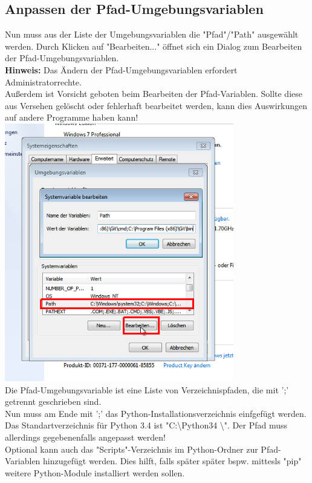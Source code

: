 \documentclass[ngerman,oneside, a4letter]{scrbook}
\begin{document}
\clearpage
\subsection{Anpassen der Pfad-Umgebungsvariablen}
Nun muss aus der Liste der Umgebungsvariablen die "Pfad"/"Path" ausgewählt werden.
Durch Klicken auf "Bearbeiten..." öffnet sich ein Dialog zum Bearbeiten der Pfad-Umgebungsvariablen.
\\
\textbf{Hinweis:} Das Ändern der Pfad-Umgebungsvariablen erfordert Administratorrechte.
\\
Außerdem ist Vorsicht geboten beim Bearbeiten der Pfad-Variablen. Sollte diese aus Versehen gelöscht oder fehlerhaft bearbeitet werden, kann dies Auswirkungen auf andere Programme haben kann!
\\
\includegraphics[width=100mm]{bilder/edit_path}
\\
Die Pfad-Umgebungsvariable ist eine Liste von Verzeichnispfaden, die mit ';' getrennt geschrieben sind.
\\
Nun muss am Ende mit ';' das Python-Installationsverzeichnis einfgefügt werden. Das Standartverzeichnis für Python 3.4 ist "C:\textbackslash Python34 \textbackslash". Der Pfad muss allerdings gegebenenfalls angepasst werden!
\\
Optional kann auch das "Scripts"-Verzeichnis im Python-Ordner zur Pfad-Variablen hinzugefügt werden. Dies hilft, falls später später bspw. mittesls "pip" weitere Python-Module installiert werden sollen.
\\
\end{document}
